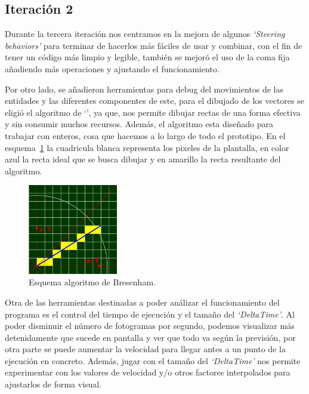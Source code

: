 \subsection*{Iteración 2}
Durante la tercera iteración nos centramos en la mejora de algunos \textit{`Steering behaviors'}
para terminar de hacerlos más fáciles de usar y combinar, con el fin de tener un código más 
limpio y legible, también se mejoró el uso de la coma fija añadiendo más operaciones y ajustando
el funcionamiento.

Por otro lado, se añadieron herramientas para debug del movimientos de las entidades y las
diferentes componentes de este, para el dibujado de los vectores se eligió el algoritmo de
`\citeauthor*{Bresenham1962}', ya que, nos permite dibujar rectas de una forma efectiva
y sin consumir muchos recursos. Además, el algoritmo esta diseñado para trabajar con enteros,
cosa que hacemos a lo largo de todo el prototipo. En el esquema~\ref{fig:bresenham} la 
cuadricula blanca representa los pixeles de la plantalla, en color azul la recta ideal que
se busca dibujar y en amarillo la recta resultante del algoritmo.

\begin{figure}[ht]
\centering
\includegraphics[width=0.35\textwidth]{imagenes/diario_desarrollo/linea_ideal.png}
\caption{Esquema algoritmo de Bresenham.}
\label{fig:bresenham}
\end{figure} 

Otra de las herramientas destinadas a poder análizar el funcionamiento del programa es
el control del tiempo de ejecución y el tamaño del \textit{`DeltaTime'}. Al poder disminuir
el número de fotogramas por segundo, podemos visualizar más detenidamente que sucede en
pantalla y ver que todo va según la previsión, por otra parte se puede aumentar la velocidad
para llegar antes a un punto de la ejecución en concreto. Además, jugar con el tamaño del
\textit{`DeltaTime'} nos permite experimentar con los valores de velocidad y/o otros factores
interpolados para ajustarlos de forma visual. 

